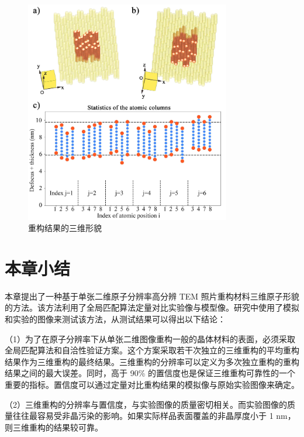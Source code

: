 \begin{figure}[H]
	\vspace{\baselineskip}
	\centering
	\includegraphics[width=0.8\textwidth]{../2.19/219}
	\caption{重构结果的三维形貌}\label{fig:219}
	\song{}
\end{figure}






\section{本章小结}
本章提出了一种基于单张二维原子分辨率高分辨 TEM 照片重构材料三维原子形貌的方法。该方法利用了全局匹配算法定量对比实验像与模型像。研究中使用了模拟和实验的图像来测试该方法，从测试结果可以得出以下结论：

（1）为了在原子分辨率下从单张二维图像重构一般的晶体材料的表面，必须采取全局匹配算法和自洽性验证方案。这个方案采取若干次独立的三维重构的平均重构结果作为三维重构的最终结果。三维重构的分辨率可以定义为多次独立重构的重构结果之间的最大误差。同时，高于 90\% 的置信度也是保证三维重构可靠性的一个重要的指标。置信度可以通过定量对比重构结果的模拟像与原始实验图像来确定。


（2）三维重构的分辨率与置信度，与实验图像的质量密切相关。而实验图像的质量往往最容易受非晶污染的影响。如果实际样品表面覆盖的非晶厚度小于 1 nm，则三维重构的结果较可靠。
